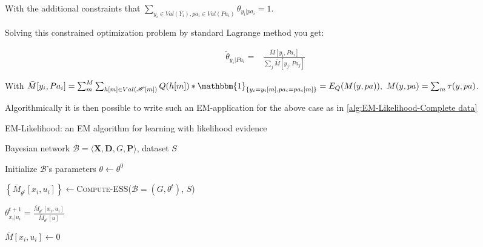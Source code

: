 \documentclass[11pt]{article}
\begin{document}
\begin{article}
With the additional constraints that \(\sum_{y_i \in Val(Y_i), pa_i
    \in Val(Pa_i)} \theta_{y_i | pa_i} = 1\).

Solving this constrained optimization problem by standard
Lagrange method you get: 

\begin{align} \label{eq:solution}
\tilde{\theta}_{y_i | Pa_i} =& \frac{\bar{M}[y_i, Pa_i]}{\sum_j \bar{M}[y_j, Pa_j]}
\end{align}

With \(\bar{M}[y_i, Pa_i] = \sum_m^M \sum_{h[m] \in
    Val(\mathscr{H}[m])} Q(h[m]) * \mathbbm{1}_{\{y_i = y_i[m], pa_i =
    pa_i[m]\}} = E_Q(M(y, pa)), \ M(y, pa) = \sum_m \tau(y,pa)\).

Algorithmically it is then possible to write such an EM-application for
the above case as in \ref{alg:EM-Likelihood-Complete data}

\algrenewcommand\algorithmicindent{1.5em}%

\begin{algorithm*}[h!]
\caption{EM-Likelihood: an EM algorithm for learning with likelihood evidence}
\label{alg:EM-Likelihood-Complete data}
\vspace{-10pt}
\begin{multicols}{2}
\begin{algorithmic}[1] 
\Require Bayesian network $\mathcal{B}=\langle \mathbf{X},\mathbf{D}, G, \mathbf{P} \rangle$, dataset $S$ 

\State Initialize $\mathcal{B}$'s parameters $\theta \leftarrow \theta^0$

  \State $\left\{ \bar{M}_{\theta^t}[x_{i},u_{i}]\right\} \leftarrow$\textsc{Compute-ESS}($\mathcal{B}=(G,\theta^{t})$, $S$)



      \State $\theta_{x_{i}|u_{i}}^{t+1}=\frac{\bar{M}_{\theta^{t}}[x_{i},u_{i}]}{\bar{M}_{\theta^{t}}[u]}$
    \EndFor
  \EndFor
\EndFor
\EndProcedure
\\

   \State $\bar{M}[x_{i},u_{i}]\leftarrow 0$
  \EndFor
\EndFor


\end{algorithmic}
\end{multicols}
\end{algorithm*}
\end{article}
\end{document}
